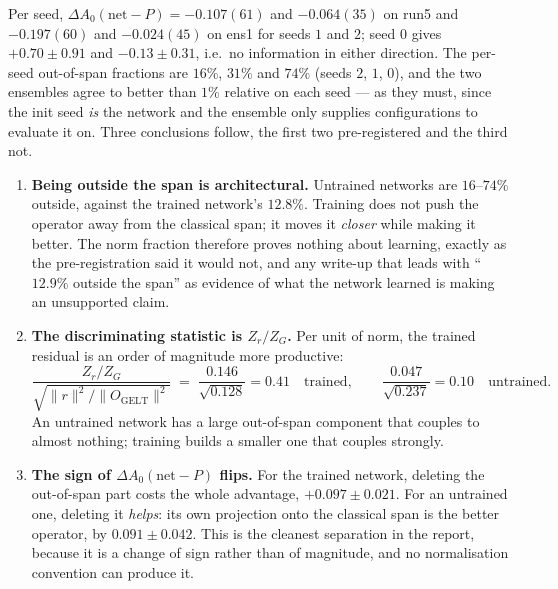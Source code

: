 \documentclass[11pt,a4paper]{article}
\newcommand{\dAzero}{\Delta A_0}
\newcommand{\OG}{O_{\mathrm{GELT}}}
\begin{document}
Per seed, $\dAzero(\text{net}-P) = -0.107(61)$ and $-0.064(35)$ on run5 and
$-0.197(60)$ and $-0.024(45)$ on ens1 for seeds $1$ and $2$; seed $0$ gives
$+0.70 \pm 0.91$ and $-0.13 \pm 0.31$, i.e.\ no information in either direction.
The per-seed out-of-span fractions are $16\%$, $31\%$ and $74\%$ (seeds $2$, $1$,
$0$), and the two ensembles agree to better than $1\%$ relative on each seed ---
as they must, since the init seed \emph{is} the network and the ensemble only
supplies configurations to evaluate it on. Three conclusions follow, the first
two pre-registered and the third not.

\begin{enumerate}
  \item \textbf{Being outside the span is architectural.} Untrained networks are
        $16$--$74\%$ outside, against the trained network's $12.8\%$. Training
        does not push the operator away from the classical span; it moves it
        \emph{closer} while making it better. The norm fraction therefore proves
        nothing about learning, exactly as the pre-registration said it would
        not, and any write-up that leads with ``$12.9\%$ outside the span'' as
        evidence of what the network learned is making an unsupported claim.
  \item \textbf{The discriminating statistic is $Z_r/Z_G$.} Per unit of norm,
        the trained residual is an order of magnitude more productive:
        \begin{equation}
          \frac{Z_r/Z_G}{\sqrt{\|r\|^2/\|\OG\|^2}}
          \;=\; \frac{0.146}{\sqrt{0.128}} = 0.41
          \quad\text{trained},
          \qquad
          \frac{0.047}{\sqrt{0.237}} = 0.10
          \quad\text{untrained}.
        \end{equation}
        An untrained network has a large out-of-span component that couples to
        almost nothing; training builds a smaller one that couples strongly.
  \item \textbf{The sign of $\dAzero(\text{net}-P)$ flips.} For the trained
        network, deleting the out-of-span part costs the whole advantage,
        $+0.097 \pm 0.021$. For an untrained one, deleting it \emph{helps}: its
        own projection onto the classical span is the better operator, by
        $0.091 \pm 0.042$. This is the cleanest separation in the report,
        because it is a change of sign rather than of magnitude, and no
        normalisation convention can produce it.
\end{enumerate}
\end{document}
